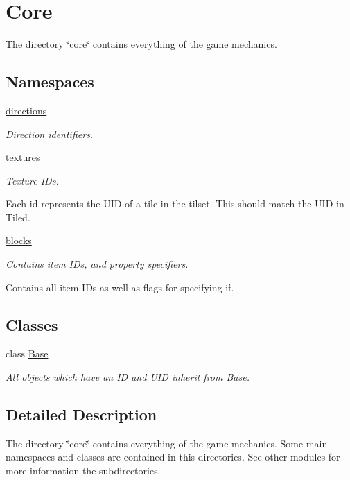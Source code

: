 \hypertarget{group__core}{\section{Core}
\label{group__core}
}


The directory \char`\"{}core\char`\"{} contains everything of the game mechanics.  


\subsection*{Namespaces}
\begin{DoxyCompactItemize}
\item 
\hyperlink{namespacedirections}{directions}
\begin{DoxyCompactList}\small\item\em Direction identifiers. \end{DoxyCompactList}\item 
\hyperlink{namespacetextures}{textures}
\begin{DoxyCompactList}\small\item\em Texture I\-Ds.

Each id represents the U\-I\-D of a tile in the tilset. This should match the U\-I\-D in Tiled. \end{DoxyCompactList}\item 
\hyperlink{namespaceblocks}{blocks}
\begin{DoxyCompactList}\small\item\em Contains item I\-Ds, and property specifiers.

Contains all item I\-Ds as well as flags for specifying if. \end{DoxyCompactList}\end{DoxyCompactItemize}
\subsection*{Classes}
\begin{DoxyCompactItemize}
\item 
class \hyperlink{classBase}{Base}
\begin{DoxyCompactList}\small\item\em All objects which have an I\-D and U\-I\-D inherit from \hyperlink{classBase}{Base}. \end{DoxyCompactList}\end{DoxyCompactItemize}


\subsection{Detailed Description}
The directory \char`\"{}core\char`\"{} contains everything of the game mechanics. Some main namespaces and classes are contained in this directories. See other modules for more information the subdirectories. 